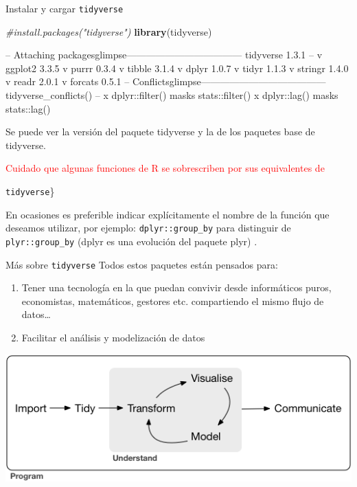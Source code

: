 \documentclass[
  ignorenonframetext,
  aspectratio=169]{beamer}
\newenvironment{Shaded}{\begin{snugshade}}{\end{snugshade}}
\newcommand{\CommentTok}[1]{\textcolor[rgb]{0.56,0.35,0.01}{\textit{#1}}}
\newcommand{\FunctionTok}[1]{\textcolor[rgb]{0.13,0.29,0.53}{\textbf{#1}}}
\newcommand{\NormalTok}[1]{#1}
\let\oldverbatim\verbatim
\let\endoldverbatim\endverbatim
\renewenvironment{verbatim}{\tiny\oldverbatim}{\endoldverbatim}
\newcommand\red[1]{\textcolor{red}{#1}}
\begin{document}
\begin{frame}[fragile]{Instalar y cargar \texttt{tidyverse}}
\label{instalar-y-cargar-tidyverse}
\begin{Shaded}
\begin{Highlighting}[]
\CommentTok{\#install.packages("tidyverse")}
\FunctionTok{library}\NormalTok{(tidyverse)}
\end{Highlighting}
\end{Shaded}

\begin{verbatim}
-- Attaching packagesglimpse------------------------------------ tidyverse 1.3.1 --
v ggplot2 3.3.5 v purrr 0.3.4
v tibble 3.1.4 v dplyr 1.0.7
v tidyr 1.1.3 v stringr 1.4.0
v readr 2.0.1 v forcats 0.5.1
-- Conflictsglimpse--------------------------------------- tidyverse_conflicts() --
x dplyr::filter() masks stats::filter()
x dplyr::lag() masks stats::lag()
\end{verbatim}

Se puede ver la versión del paquete tidyverse y la de los paquetes base
de tidyverse.

\red{Cuidado que algunas funciones de R se sobrescriben por sus equivalentes de}

\texttt{tidyverse}\}

En ocasiones es preferible indicar explícitamente el nombre de la
función que deseamos utilizar, por ejemplo: \texttt{dplyr::group\_by}
para distinguir de \texttt{plyr::group\_by} (dplyr es una evolución del
paquete plyr) .
\end{frame}

\begin{frame}{Más sobre \texttt{tidyverse}}
\label{muxe1s-sobre-tidyverse}
Todos estos paquetes están pensados para:

\begin{enumerate}
\item
  Tener una tecnología en la que puedan convivir desde informáticos
  puros, economistas, matemáticos, gestores etc. compartiendo el mismo
  flujo de datos\ldots{}
\item
  Facilitar el análisis y modelización de datos
\end{enumerate}

\begin{center}\includegraphics[width=0.6\linewidth]{Imgs/data-science} \end{center}
\end{frame}
\end{document}
